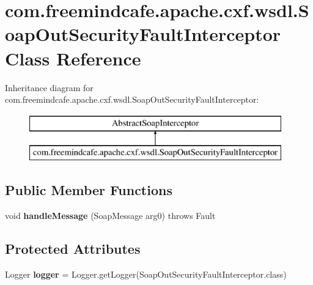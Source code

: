 \hypertarget{classcom_1_1freemindcafe_1_1apache_1_1cxf_1_1wsdl_1_1_soap_out_security_fault_interceptor}{}\section{com.\+freemindcafe.\+apache.\+cxf.\+wsdl.\+Soap\+Out\+Security\+Fault\+Interceptor Class Reference}
\label{classcom_1_1freemindcafe_1_1apache_1_1cxf_1_1wsdl_1_1_soap_out_security_fault_interceptor}
Inheritance diagram for com.\+freemindcafe.\+apache.\+cxf.\+wsdl.\+Soap\+Out\+Security\+Fault\+Interceptor\+:\begin{figure}[H]
\begin{center}
\leavevmode
\includegraphics[height=2.000000cm]{classcom_1_1freemindcafe_1_1apache_1_1cxf_1_1wsdl_1_1_soap_out_security_fault_interceptor}
\end{center}
\end{figure}
\subsection*{Public Member Functions}
\begin{DoxyCompactItemize}
\item 
\hypertarget{classcom_1_1freemindcafe_1_1apache_1_1cxf_1_1wsdl_1_1_soap_out_security_fault_interceptor_a2e9b6ea7eb922d638cf54d7088c97e1b}{}void {\bfseries handle\+Message} (Soap\+Message arg0)  throws Fault \label{classcom_1_1freemindcafe_1_1apache_1_1cxf_1_1wsdl_1_1_soap_out_security_fault_interceptor_a2e9b6ea7eb922d638cf54d7088c97e1b}

\end{DoxyCompactItemize}
\subsection*{Protected Attributes}
\begin{DoxyCompactItemize}
\item 
\hypertarget{classcom_1_1freemindcafe_1_1apache_1_1cxf_1_1wsdl_1_1_soap_out_security_fault_interceptor_ac31656069307a1def8c3be24778f9721}{}Logger {\bfseries logger} = Logger.\+get\+Logger(Soap\+Out\+Security\+Fault\+Interceptor.\+class)\label{classcom_1_1freemindcafe_1_1apache_1_1cxf_1_1wsdl_1_1_soap_out_security_fault_interceptor_ac31656069307a1def8c3be24778f9721}

\end{DoxyCompactItemize}


